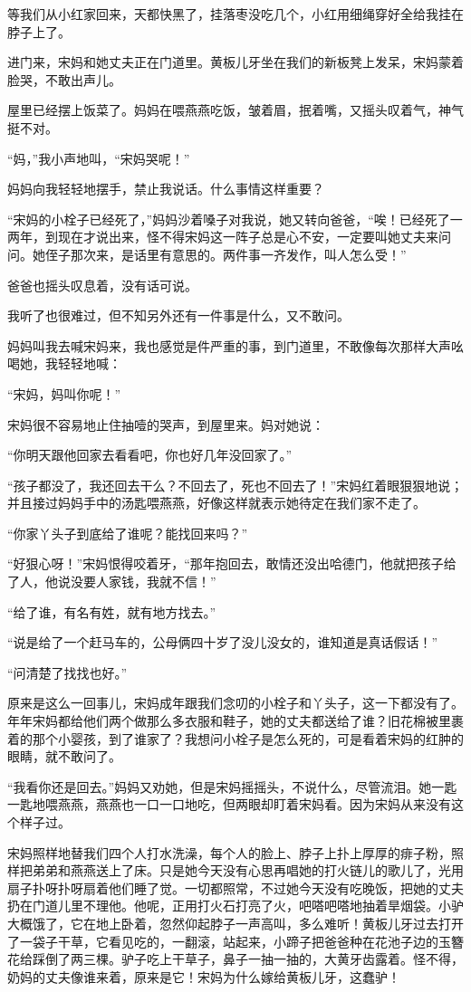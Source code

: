 \par 等我们从小红家回来，天都快黑了，挂落枣没吃几个，小红用细绳穿好全给我挂在脖子上了。
\par 进门来，宋妈和她丈夫正在门道里。黄板儿牙坐在我们的新板凳上发呆，宋妈蒙着脸哭，不敢出声儿。
\par 屋里已经摆上饭菜了。妈妈在喂燕燕吃饭，皱着眉，抿着嘴，又摇头叹着气，神气挺不对。
\par “妈，”我小声地叫，“宋妈哭呢！”
\par 妈妈向我轻轻地摆手，禁止我说话。什么事情这样重要？
\par “宋妈的小栓子已经死了，”妈妈沙着嗓子对我说，她又转向爸爸，“唉！已经死了一两年，到现在才说出来，怪不得宋妈这一阵子总是心不安，一定要叫她丈夫来问问。她侄子那次来，是话里有意思的。两件事一齐发作，叫人怎么受！”
\par 爸爸也摇头叹息着，没有话可说。
\par 我听了也很难过，但不知另外还有一件事是什么，又不敢问。
\par 妈妈叫我去喊宋妈来，我也感觉是件严重的事，到门道里，不敢像每次那样大声吆喝她，我轻轻地喊：
\par “宋妈，妈叫你呢！”
\par 宋妈很不容易地止住抽噎的哭声，到屋里来。妈对她说：
\par “你明天跟他回家去看看吧，你也好几年没回家了。”
\par “孩子都没了，我还回去干么？不回去了，死也不回去了！”宋妈红着眼狠狠地说；并且接过妈妈手中的汤匙喂燕燕，好像这样就表示她待定在我们家不走了。
\par “你家丫头子到底给了谁呢？能找回来吗？”
\par “好狠心呀！”宋妈恨得咬着牙，“那年抱回去，敢情还没出哈德门，他就把孩子给了人，他说没要人家钱，我就不信！”
\par “给了谁，有名有姓，就有地方找去。”
\par “说是给了一个赶马车的，公母俩四十岁了没儿没女的，谁知道是真话假话！”
\par “问清楚了找找也好。”
\par 原来是这么一回事儿，宋妈成年跟我们念叨的小栓子和丫头子，这一下都没有了。年年宋妈都给他们两个做那么多衣服和鞋子，她的丈夫都送给了谁？旧花棉被里裹着的那个小婴孩，到了谁家了？我想问小栓子是怎么死的，可是看着宋妈的红肿的眼睛，就不敢问了。
\par “我看你还是回去。”妈妈又劝她，但是宋妈摇摇头，不说什么，尽管流泪。她一匙一匙地喂燕燕，燕燕也一口一口地吃，但两眼却盯着宋妈看。因为宋妈从来没有这个样子过。
\par 宋妈照样地替我们四个人打水洗澡，每个人的脸上、脖子上扑上厚厚的痱子粉，照样把弟弟和燕燕送上了床。只是她今天没有心思再唱她的打火链儿的歌儿了，光用扇子扑呀扑呀扇着他们睡了觉。一切都照常，不过她今天没有吃晚饭，把她的丈夫扔在门道儿里不理他。他呢，正用打火石打亮了火，吧嗒吧嗒地抽着旱烟袋。小驴大概饿了，它在地上卧着，忽然仰起脖子一声高叫，多么难听！黄板儿牙过去打开了一袋子干草，它看见吃的，一翻滚，站起来，小蹄子把爸爸种在花池子边的玉簪花给踩倒了两三棵。驴子吃上干草子，鼻子一抽一抽的，大黄牙齿露着。怪不得，奶妈的丈夫像谁来着，原来是它！宋妈为什么嫁给黄板儿牙，这蠢驴！
